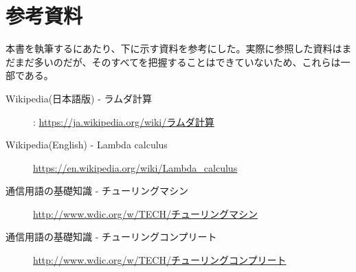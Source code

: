 {	\section{参考資料}{
		本書を執筆するにあたり、下に示す資料を参考にした。実際に参照した資料はまだまだ多いのだが、そのすべてを把握することはできていないため、これらは一部である。
		
		\begin{description}
			\item[Wikipedia(日本語版) - ラムダ計算] : \url{https://ja.wikipedia.org/wiki/ラムダ計算}
			\item[Wikipedia(English) - Lambda calculus] \url{https://en.wikipedia.org/wiki/Lambda_calculus}
			\item[通信用語の基礎知識 - チューリングマシン] \url{http://www.wdic.org/w/TECH/チューリングマシン}
			\item[通信用語の基礎知識 - チューリングコンプリート] \url{http://www.wdic.org/w/TECH/チューリングコンプリート}
		\end{description}

	}
}